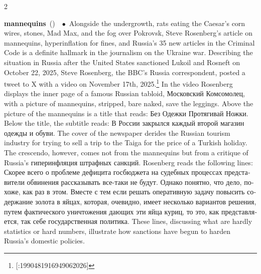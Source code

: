 \documentclass[10pt,a4paper,twoside]{article} %
\newcommand{\entry}[4]{\markboth{#1}{#1}\textbf{#1}\ {(#2)}\ \textit{#3}\ $\bullet$\ {#4}}  %
\begin{document}
\begin{multicols}{2}
{\entry{mannequins} {} {} {Alongside the undergrowth, rats eating the Caesar's corn wires, stones, Mad Max, and the fog over Pokrovsk, Steve Rosenberg's article on mannequins, hyperinflation for fines, and Russia's 35 new articles in the Criminal Code is a definite hallmark in the journalism on the Ukraine war. Describing the situation in Russia after the United States sanctioned Lukoil and Rosneft on October 22, 2025, Steve Rosenberg, the BBC's Russia correspondent, posted a tweet to X with a video on November 17th, 2025.\footnote{[\@BBCSteveR:1990481916949062026]} In the video Rosenberg displays the inner page of a famous Russian tabloid, \textrussian{Московский Комсомолец}, with a picture of mannequins, stripped, bare naked, save the leggings. Above the picture of the mannequins is a title that reads: \textrussian{Без Одежки Протягивай Ножки}. Below the title, the subtitle reads: \textrussian{В России закрылся каждый второй магазин одежды и обуви}. The cover of the newspaper derides the Russian tourism industry for trying to sell a trip to the Taiga for the price of a Turkish holiday. \newline \indent The crescendo, however, comes not from the mannequins but from a critique of Russia's \textrussian{гиперинфляция штрафных санкций}. Rosenberg reads the following lines: \textrussian{Скорее всего о проблеме дефицита госбюджета на судебных процессах представители обвинения рассказывать все-таки не будут. Однако понятно, что дело, похоже, как раз в этом. Вместе с тем если решать оперативную задачу повысить содержание золота в яйцах, которая, очевидно, имеет несколько вариантов решения, путем фактического уничтожения дающих эти яйца куриц, то это, как представляется, так себе государственная политика.} These lines, discussing what are hardly statistics or hard numbers, illustrate how sanctions have begun to harden Russia's domestic policies.}

}
\end{multicols}
\end{document}

